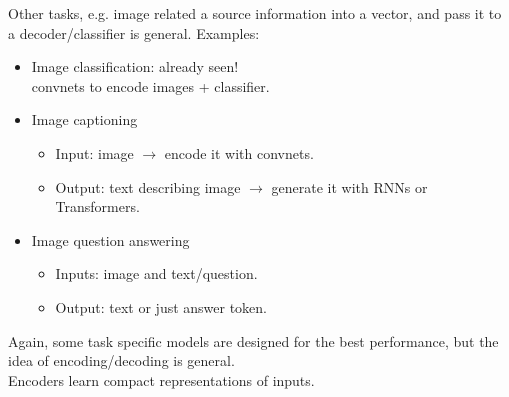 \begin{frame}{Other tasks, e.g. image related}
 a source information into a vector, 
and pass it to a decoder/classifier is general. Examples:
\begin{itemize}
\item Image classification: already seen!\\ convnets to encode images + classifier.
\item Image captioning
\begin{itemize}
\item Input: image $\rightarrow$ encode it with convnets.
\item Output: text describing image $\rightarrow$ generate it with RNNs or Transformers.
\end{itemize}
\item Image question answering
\begin{itemize}
\item Inputs: image and text/question.
\item Output: text or just answer token.
\end{itemize}
\end{itemize}
Again, some task specific models are designed for the best
performance, but the idea of encoding/decoding
is general.\\
Encoders learn compact representations of inputs.
\end{frame}

%
%

%

